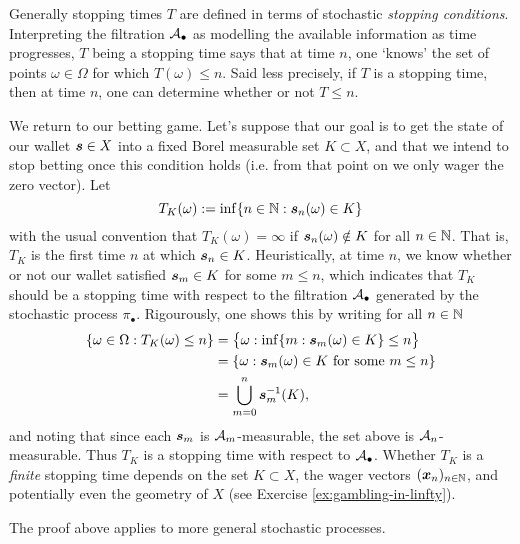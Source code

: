 Generally stopping times $T$ are defined in terms of stochastic \emph{stopping conditions}.
Interpreting the filtration $\mathcal{A}_\bullet$ as modelling the available information as time progresses, $T$ being a stopping time says that at time $n$, one `knows' the set of points $\omega \in \Omega$ for which $T(\omega) \leq n$.
Said less precisely, if $T$ is a stopping time, then at time $n$, one can determine whether or not $T \leq n$.

\begin{example}\label{eg:gambling-stoppingtimes}
  We return to our betting game.
  Let's suppose that our goal is to get the state of our wallet $\bm{s} \in X$ into a fixed Borel measurable set $K \subset X$, and that we intend to stop betting once this condition holds (i.e. from that point on we only wager the zero vector).
  Let
  \begin{equation*}
    T_K(\omega) := \inf\{n \in \mathbb{N} : \bm{s}_n(\omega) \in K \}
  \end{equation*}
  with the usual convention that $T_K(\omega) = \infty$ if $\bm{s}_n(\omega) \notin K$ for all $n \in \mathbb{N}$.
  That is, $T_K$ is the first time $n$ at which $\bm{s}_n \in K$.
  Heuristically, at time $n$, we know whether or not our wallet satisfied $\bm{s}_m \in K$ for some $m \leq n$, which indicates that $T_K$ should be a stopping time with respect to the filtration $\mathcal{A}_{\bullet}$ generated by the stochastic process $\pi_{\bullet}$.
  Rigourously, one shows this by writing for all $n \in \mathbb{N}$
  \begin{equation*}
    \begin{aligned}
      \{\omega \in \Omega : T_K(\omega) \leq n\}
      &= \big\{\omega : \inf\{m : \bm{s}_m(\omega) \in K\} \leq n\big\} \\
      &= \{\omega  : \text{$\bm{s}_m(\omega) \in K$ for some $m \leq n$}\} \\
      &= \bigcup_{m = 0}^n \bm{s}_m^{-1}(K),
    \end{aligned}
  \end{equation*}
  and noting that since each $\bm{s}_m$ is $\mathcal{A}_m$-measurable, the set above is $\mathcal{A}_n$-measurable.
  Thus $T_K$ is a stopping time with respect to $\mathcal{A}_{\bullet}$.
  Whether $T_K$ is a \emph{finite} stopping time depends on the set $K \subset X$, the wager vectors $(\bm{x}_n)_{n \in \mathbb{N}}$, and potentially even the geometry of $X$ (see Exercise \ref{ex:gambling-in-linfty}).
\end{example}

The proof above applies to more general stochastic processes.

